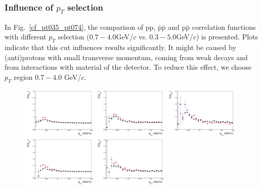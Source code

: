\subsubsection{Influence of $p_T$ selection}
In Fig.~\ref{cf_pt035_pt074}, the comparison of pp, $\bar{\mathrm{p}}\bar{\mathrm{p}}$ and p$\bar{\mathrm{p}}$ correlation functions with different $p_T$ selection ($0.7-4.0$GeV/$c$ vs. $0.3-5.0$GeV/$c$) is presented. Plots indicate that this cut influences results significantly. It might be caused by (anti)protons with small transverse momentum, coming from weak decays and from interactions with material of the detector. To reduce this effect, we choose $p_T$ region $0.7-4.0$ GeV/$c$.
\begin{figure}%
  \centering
  \includegraphics[width=0.32\textwidth]{cmp_dcatpconly11h_pt0745_pt035_cen0/PP}
  \includegraphics[width=0.32\textwidth]{cmp_dcatpconly11h_pt0745_pt035_cen2/PP}
  \includegraphics[width=0.32\textwidth]{cmp_dcatpconly11h_pt0745_pt035_cen4/PP}
  \includegraphics[width=0.32\textwidth]{cmp_dcatpconly11h_pt0745_pt035_cen0/APAP}
  \includegraphics[width=0.32\textwidth]{cmp_dcatpconly11h_pt0745_pt035_cen2/APAP}

\end{figure}
